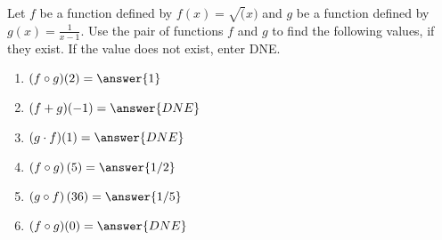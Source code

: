 \documentclass{ximera}
\author{Kenneth Berglund}
\begin{document}
\licenseSZ
\begin{exercise}
Let $f$ be a function defined by $f(x) = \sqrt(x)$ and $g$ be a function defined by $g(x) =\frac{1}{x-1}$. Use the pair of functions $f$ and $g$ to find the following values, if they exist. If the value does not exist, enter DNE.
\begin{enumerate}
\item $(f \circ g)(2) = \answer{1}$
\item $(f + g)(-1) = \answer{DNE}$
\item $(g \cdot f)(1) = \answer{DNE}$
\item $(f \circ g)\left(5\right) = \answer{1/2}$
\item $(g\circ f)\left(36\right) = \answer{1/5}$
\item $(f \circ g)(0) = \answer{DNE}$
\end{enumerate}

\end{exercise}
\end{document}
